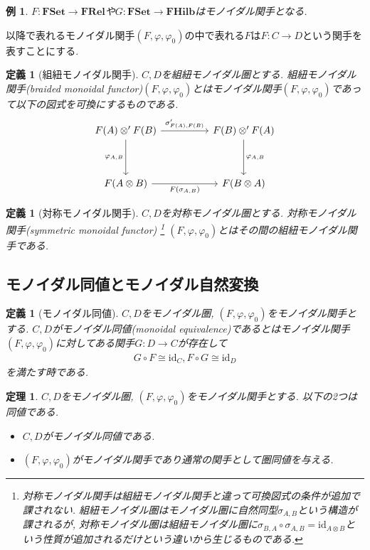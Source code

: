 \documentclass[a4paper,12pt]{ltjsarticle}
\theoremstyle{break}
\newtheorem{defn}[thm]{定義}
\newtheorem{eg}[thm]{例}
\newtheorem{thrm}[thm]{定理}
\newcommand{\fset}{\mathbf{FSet}}
\newcommand{\frel}{\mathbf{FRel}}
\newcommand{\fhilb}{\mathbf{FHilb}}
\newcommand{\id}{\mathrm{id}}
\newcommand{\ci}{\circ}
\newcommand{\si}{\sigma}
\newcommand{\vp}{\varphi}
\newcommand{\ot}{\otimes}
\numberwithin{equation}{section}
\begin{document}
\begin{eg}
  $F: \fset \to \frel$や$G: \fset \to \fhilb$はモノイダル関手となる. 
\end{eg}

以降で表れるモノイダル関手$(F,\vp,\vp_0)$の中で表れる$F$は$F: C \to D$という関手を表すことにする. 

\begin{defn}[組紐モノイダル関手]
  $C,D$を組紐モノイダル圏とする. 
  組紐モノイダル関手(braided monoidal functor)$(F,\vp,\vp_0)$とはモノイダル関手$(F,\vp,\vp_0)$であって以下の図式を可換にするものである. 
  \[\begin{tikzcd}
    {F(A) \ot' F(B)} && {F(B) \ot' F(A)} \\
    \\
    {F(A \ot B)} && {F(B \ot A)}
    \arrow["{\si_{F(A),F(B)}'}", from=1-1, to=1-3]
    \arrow["{\vp_{A,B}}"', from=1-1, to=3-1]
    \arrow["{F(\si_{A,B})}"', from=3-1, to=3-3]
    \arrow["{\vp_{A,B}}", from=1-3, to=3-3]
  \end{tikzcd}\]
\end{defn}

\begin{defn}[対称モノイダル関手]
  $C,D$を対称モノイダル圏とする. 
  対称モノイダル関手(symmetric monoidal functor)
  \footnote{
    対称モノイダル関手は組紐モノイダル関手と違って可換図式の条件が追加で課されない. 
    組紐モノイダル圏はモノイダル圏に自然同型$\si_{A,B}$という構造が課されるが, 対称モノイダル圏は組紐モノイダル圏に$\si_{B,A} \ci \si_{A,B} = \id_{A \ot B}$という性質が追加されるだけという違いから生じるものである. 
  }
  $(F,\vp,\vp_0)$とはその間の組紐モノイダル関手である. 
\end{defn}

\subsection{モノイダル同値とモノイダル自然変換}

\begin{defn}[モノイダル同値]
  $C,D$をモノイダル圏, $(F,\vp,\vp_0)$をモノイダル関手とする. 
  $C,D$がモノイダル同値(monoidal equivalence)であるとはモノイダル関手$(F,\vp,\vp_0)$に対してある関手$G: D \to C$が存在して
  \begin{align*}
    G \ci F \cong \id_C,  F \ci G \cong \id_D
  \end{align*}  
  を満たす時である. 
\end{defn} 

\begin{thrm}
  $C,D$をモノイダル圏, $(F,\vp,\vp_0)$をモノイダル関手とする. 以下の2つは同値である. 
  \begin{itemize}
    \item $C,D$がモノイダル同値である. 
    \item $(F,\vp,\vp_0)$がモノイダル関手であり通常の関手として圏同値を与える. 
  \end{itemize}
\end{thrm}
\end{document}
